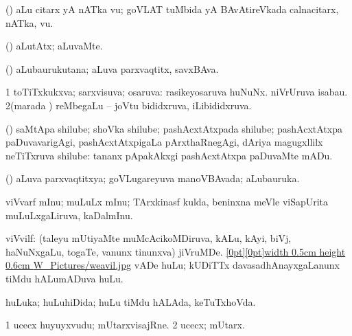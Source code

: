 {{\bentry
{} 
\gl{\nA}
\bmng
(\AmA) aLu citarx yA nATka \mo vu; goVLAT tuMbida yA BAvAtireVkada calnacitarx, nATka, \mo vu. 
\emng
\eentry

\bentry
{} 
\gl{\kirxvi}
\expl{}
\bmng
(\AmA) aLutAtx; aLuvaMte. 
\emng
\eentry

\bentry
{} 
\gl{\nA}
\expl{}
\bmng
(\AmA) aLubaurukutana; aLuva parxvaqtitx, savxBAva. 
\emng
\eentry

\bentry
{} 
\gl{\gu}
\expl{}
\bmng
\bnum
\num{1} toTiTxkukxva; sarxvisuva; osaruva:  rasikeyosaruva huNuNx.  niVrUruva isabau. 
\num{2}(marada \vi) reMbegaLu -- joVtu bididxruva, iLibididxruva. 
\enum
\emng
\eentry

\bentry
{} 
\gl{\nA}
\expl{}
\bmng
(\ca) saMtApa shilube; shoVka shilube; pashAcxtAtxpada shilube; pashAcxtAtxpa paDuvavarigAgi, pashAcxtAtxpigaLa pArxthaRnegAgi, dAriya magugxllilx neTiTxruva shilube:  tananx pApakAkxgi pashAcxtAtxpa paDuvaMte mADu. 
\emng
\eentry

\bentry
{} 
\gl{\gu}
\bmng
(\AmA) aLuva parxvaqtitxya; goVLugareyuva manoVBAvada; aLubauruka. 
\emng
\eentry

\bentry
{} 
\gl{\nA}
\expl{}
\bmng
{} 
\emng
\eentry

\bentry
{} 
\gl{\nA}
\expl{}
\bmng
viVvarf mInu; muLuLx mInu; TArxkinasf kulda, beninxna meVle viSapUrita muLuLxgaLiruva, kaDalmInu. 
\emng
\eentry

\bentry
{} 
\gl{\nA}
\expl{}
\bmng
viVvilf: 
\banum
{} (taleyu mUtiyaMte muMcAcikoMDiruva, kALu, kAyi, biVj, haNuNxgaLu, togaTe, \mo vanunx tinunxva) jiVruMDe. \quad \hyperlink{weavilfigure}{\raisebox{-0.15cm}[0pt][0pt]{\pdfimage width 0.5cm height 0.6cm {W_Pictures/weavil.jpg}}} 
 vADe huLu; kUDiTTx davasadhAnayxgaLanunx tiMdu hALumADuva huLu. 
\eanum
\emng
\eentry

\bentry
{} 
\gl{\gu}
\expl{}
\bmng
huLuka; huLuhiDida; huLu tiMdu hALAda, keTuTxhoVda. 
\emng
\eentry

\bentry
{} 
\gl{\nA}
\expl{}
\bmng
\bnum
\num{1} ucecx huyuyxvudu; mUtarxvisajRne. 
\num{2} ucecx; mUtarx. 
\enum
\emng
\eentry

}}

